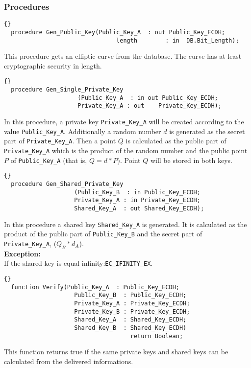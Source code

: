\subsubsection*{Procedures}
\begin{lstlisting}{}
  procedure Gen_Public_Key(Public_Key_A  : out Public_Key_ECDH;
			    			   	length        : in  DB.Bit_Length);
\end{lstlisting}
This procedure gets an elliptic curve from the database. The curve has
at least cryptographic security in length.\\ \hhline
\begin{lstlisting}{}
  procedure Gen_Single_Private_Key
  					 (Public_Key_A  : in out Public_Key_ECDH;
				     Private_Key_A : out    Private_Key_ECDH);
\end{lstlisting}
In this procedure, a private key \texttt{Private\_Key\_A} will be
created according to the value \texttt{Public\_Key\_A}. Additionally a
random number $d$ is generated as the secret part of
\texttt{Private\_\-Key\_A}. Then a point $Q$ is calculated as the
public part of \texttt{Private\_Key\_A} which is the product of the
random number and the public point $P$ of \texttt{Public\_Key\_A}
(that is, $Q=d*P$). Point $Q$ will be stored in both keys.\\ \hhline
\begin{lstlisting}{}
  procedure Gen_Shared_Private_Key
  					(Public_Key_B  : in Public_Key_ECDH;
				    Private_Key_A : in Private_Key_ECDH;
				    Shared_Key_A  : out Shared_Key_ECDH);
\end{lstlisting}
In this procedure a shared key \texttt{Shared\_Key\_A} is
generated. It is calculated as the product of the public part of
\texttt{Public\_Key\_B} and the secret part of
\texttt{Private\_Key\_A}, ($Q_B*d_A$).\\

\textbf{Exception:}\\
If the shared key is equal infinity:\quad \texttt{EC\_IFINITY\_EX}.\\
\hhline

\begin{lstlisting}{}
  function Verify(Public_Key_A  : Public_Key_ECDH;
		   			Public_Key_B  : Public_Key_ECDH;
		   			Private_Key_A : Private_Key_ECDH;
		   			Private_Key_B : Private_Key_ECDH;
		   			Shared_Key_A  : Shared_Key_ECDH;
		   			Shared_Key_B  : Shared_Key_ECDH) 
		   			                return Boolean;
\end{lstlisting}
This function returns true if the same private keys and shared keys
can be calculated from the delivered informations.


